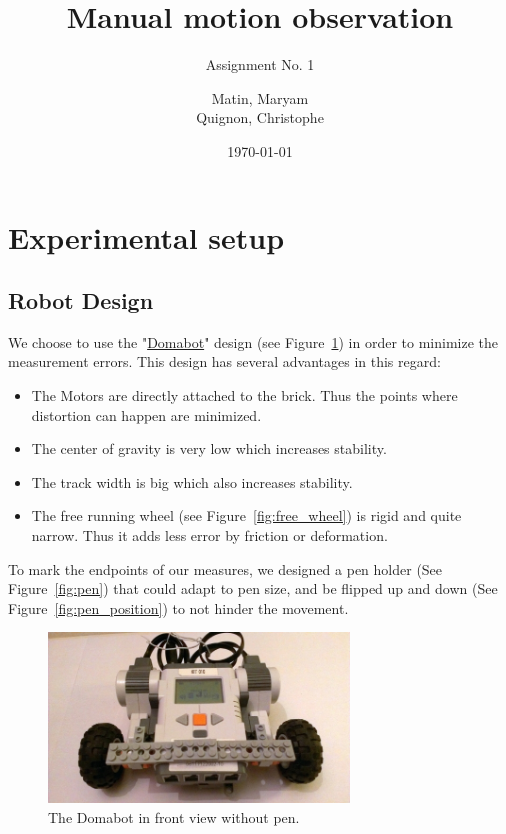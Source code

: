 \documentclass{scrartcl}
\begin{document}
\title{Manual motion observation}
\subtitle{Assignment No. 1}
\author{
  Matin, Maryam \\
  Quignon, Christophe
} 
\date{\today}


\maketitle



\section{Experimental setup}
\subsection{Robot Design}
We choose to use the "\href{http://www.damienkee.com/home/2011/8/20/domabot-classroom-robot-design.html}{Domabot}" design (see Figure~\ref{fig:front_view}) in order to minimize the measurement errors. This design has several advantages in this regard:
\begin{itemize}
\item The Motors are directly attached to the brick. Thus the points where distortion can happen are minimized.
\item The center of gravity is very low which increases stability.
\item The track width is big which also increases stability.
\item The free running wheel (see Figure~\ref{fig:free_wheel}) is rigid and quite narrow. Thus it adds less error by friction or deformation.
\end{itemize}

To mark the endpoints of our measures, we designed a pen holder  (See Figure~\ref{fig:pen}) that could adapt to pen size, and be flipped up and down (See Figure~\ref{fig:pen_position}) to not hinder the movement.

\begin{figure}
 \center
 \includegraphics[width= 8cm]{img/robot_front.jpg}
 \caption{The Domabot in front view without pen.}
 \label{fig:front_view}
\end{figure}
\end{document}
